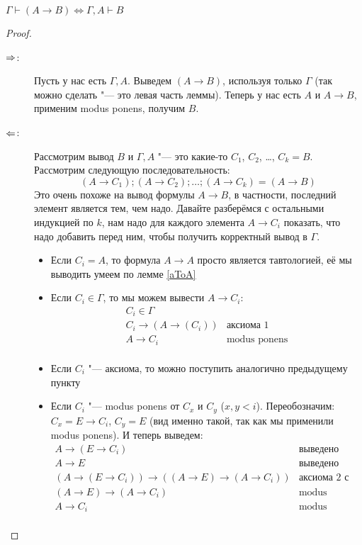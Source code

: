 \begin{lemma}[о дедукции]
	$\Gamma \vdash (A \to B) \iff \Gamma, A \vdash B$
\end{lemma}
\begin{proof}
	\begin{description}
		\item[$\Rightarrow$:]
			Пусть у нас есть $\Gamma, A$.
			Выведем $(A \to B)$, используя только $\Gamma$ (так можно сделать "--- это левая часть леммы).
			Теперь у нас есть $A$ и $A \to B$, применим modus ponens, получим $B$.
		\item[$\Leftarrow$:]
			Рассмотрим вывод $B$ и $\Gamma, A$ "--- это какие-то $C_1$, $C_2$, \dots, $C_k=B$.
			Рассмотрим следующую последовательность:
			\[ (A \to C_1); (A \to C_2); \dots; (A \to C_k) = (A \to B) \]
			Это очень похоже на вывод формулы $A \to B$, в частности, последний элемент является тем, чем надо.
			Давайте разберёмся с остальными индукцией по $k$, нам надо для каждого элемента $A \to C_i$ показать, что надо добавить
			перед ним, чтобы получить корректный вывод в $\Gamma$.
			\begin{itemize}
				\item Если $C_i = A$, то формула $A \to A$ просто является тавтологией, её мы выводить умеем по лемме \ref{aToA}
				\item Если $C_i \in \Gamma$, то мы можем вывести $A \to C_i$:
					\[
					\begin{array}{cc}
						C_i \in \Gamma  & \\
						C_i \to (A \to (C_i)) & \text{аксиома 1} \\
						A \to C_i & \text{modus ponens} \\
					\end{array}
					\]
				\item Если $C_i$ "--- аксиома, то можно поступить аналогично предыдущему пункту
				\item
					Если $C_i$ "--- modus ponens от $C_x$ и $C_y$ ($x, y < i$).
					Переобозначим: $C_x = E \to C_i$, $C_y = E$ (вид именно такой, так как мы применили modus ponens).
					И теперь выведем:
					\[
					\begin{array}{cc}
						A \to (E \to C_i) & \text{выведено раньше} \\
						A \to E & \text{выведено раньше} \\
						(A \to (E \to C_i)) \to ((A \to E) \to (A \to C_i)) & \text{аксиома 2 с подстановкой} \\
						(A \to E) \to (A \to C_i) & \text{modus ponens} \\
						A \to C_i & \text{modus ponens} \\
					\end{array}
					\]
			\end{itemize}
	\end{description}
\end{proof}


